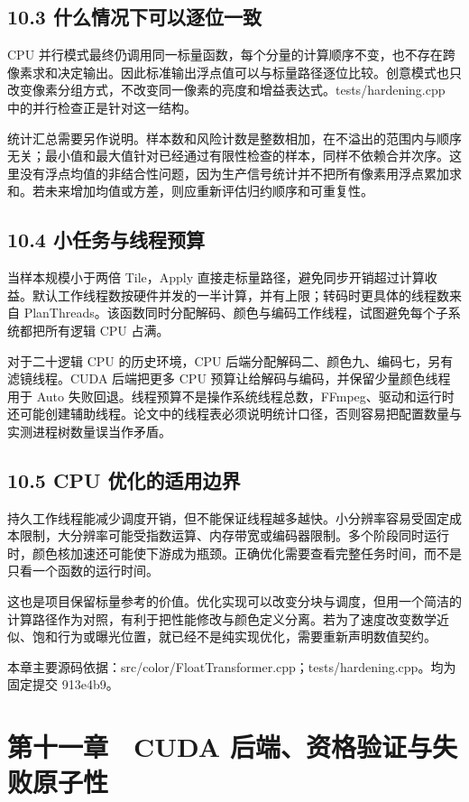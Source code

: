 \documentclass[UTF8,zihao=-4,openany]{ctexbook}
\begin{document}
\section*{10.3 什么情况下可以逐位一致}
CPU 并行模式最终仍调用同一标量函数，每个分量的计算顺序不变，也不存在跨像素求和决定输出。因此标准输出浮点值可以与标量路径逐位比较。创意模式也只改变像素分组方式，不改变同一像素的亮度和增益表达式。tests/hardening.cpp 中的并行检查正是针对这一结构。

统计汇总需要另作说明。样本数和风险计数是整数相加，在不溢出的范围内与顺序无关；最小值和最大值针对已经通过有限性检查的样本，同样不依赖合并次序。这里没有浮点均值的非结合性问题，因为生产信号统计并不把所有像素用浮点累加求和。若未来增加均值或方差，则应重新评估归约顺序和可重复性。


\section*{10.4 小任务与线程预算}
当样本规模小于两倍 Tile，Apply 直接走标量路径，避免同步开销超过计算收益。默认工作线程数按硬件并发的一半计算，并有上限；转码时更具体的线程数来自 PlanThreads。该函数同时分配解码、颜色与编码工作线程，试图避免每个子系统都把所有逻辑 CPU 占满。

对于二十逻辑 CPU 的历史环境，CPU 后端分配解码二、颜色九、编码七，另有滤镜线程。CUDA 后端把更多 CPU 预算让给解码与编码，并保留少量颜色线程用于 Auto 失败回退。线程预算不是操作系统线程总数，FFmpeg、驱动和运行时还可能创建辅助线程。论文中的线程表必须说明统计口径，否则容易把配置数量与实测进程树数量误当作矛盾。


\section*{10.5 CPU 优化的适用边界}
持久工作线程能减少调度开销，但不能保证线程越多越快。小分辨率容易受固定成本限制，大分辨率可能受指数运算、内存带宽或编码器限制。多个阶段同时运行时，颜色核加速还可能使下游成为瓶颈。正确优化需要查看完整任务时间，而不是只看一个函数的运行时间。

这也是项目保留标量参考的价值。优化实现可以改变分块与调度，但用一个简洁的计算路径作为对照，有利于把性能修改与颜色定义分离。若为了速度改变数学近似、饱和行为或曝光位置，就已经不是纯实现优化，需要重新声明数值契约。


\par\small 本章主要源码依据：src/color/FloatTransformer.cpp；tests/hardening.cpp。均为固定提交 913e4b9。\normalsize

\chapter*{第十一章　CUDA 后端、资格验证与失败原子性}
\end{document}
